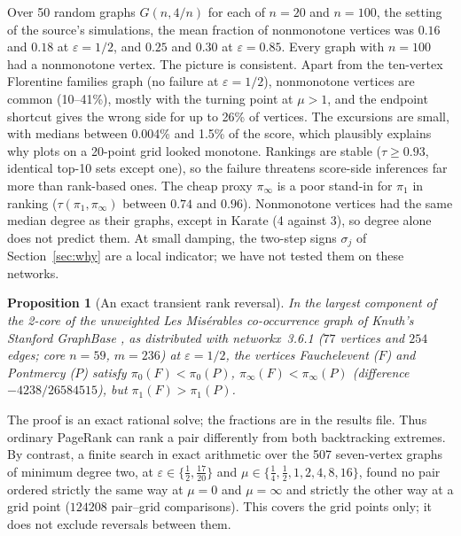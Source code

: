 \documentclass[11pt,a4paper]{article}
\newtheorem{proposition}[theorem]{Proposition}
\theoremstyle{definition}\newtheorem{conjecture}{Conjecture}
\theoremstyle{remark}\newtheorem{remark}[theorem]{Remark}
\newcommand{\eps}{\varepsilon}
\begin{document}
Over 50 random graphs $G(n,4/n)$ for each of $n=20$ and $n=100$, the setting of the source's simulations, the mean fraction of nonmonotone vertices was $0.16$ and $0.18$ at $\eps=1/2$, and $0.25$ and $0.30$ at $\eps=0.85$. Every graph with $n=100$ had a nonmonotone vertex. The picture is consistent. Apart from the ten-vertex Florentine families graph (no failure at $\eps=1/2$), nonmonotone vertices are common (10--41\%), mostly with the turning point at $\mu>1$, and the endpoint shortcut gives the wrong side for up to 26\% of vertices. The excursions are small, with medians between 0.004\% and 1.5\% of the score, which plausibly explains why plots on a 20-point grid looked monotone. Rankings are stable ($\tau\geq0.93$, identical top-10 sets except one), so the failure threatens score-side inferences far more than rank-based ones. The cheap proxy $\pi_\infty$ is a poor stand-in for $\pi_1$ in ranking ($\tau(\pi_1,\pi_\infty)$ between $0.74$ and $0.96$). Nonmonotone vertices had the same median degree as their graphs, except in Karate (4 against 3), so degree alone does not predict them. At small damping, the two-step signs $\sigma_j$ of Section~\ref{sec:why} are a local indicator; we have not tested them on these networks.

\begin{proposition}[An exact transient rank reversal]\label{prop:reversal}
In the largest component of the 2-core of the unweighted Les Mis\'erables co-occurrence graph of Knuth's Stanford GraphBase \cite{knuth}, as distributed with networkx~3.6.1 \cite{networkx} ($77$ vertices and $254$ edges; core $n=59$, $m=236$) at $\eps=1/2$, the vertices Fauchelevent ($F$) and Pontmercy ($P$) satisfy $\pi_0(F)<\pi_0(P)$, $\pi_\infty(F)<\pi_\infty(P)$ (difference $-4238/26584515$), but $\pi_1(F)>\pi_1(P)$.
\end{proposition}
The proof is an exact rational solve; the fractions are in the results file. Thus ordinary PageRank can rank a pair differently from both backtracking extremes. By contrast, a finite search in exact arithmetic over the 507 seven-vertex graphs of minimum degree two, at $\eps\in\{\tfrac12,\tfrac{17}{20}\}$ and $\mu\in\{\tfrac14,\tfrac12,1,2,4,8,16\}$, found no pair ordered strictly the same way at $\mu=0$ and $\mu=\infty$ and strictly the other way at a grid point ($124208$ pair--grid comparisons). This covers the grid points only; it does not exclude reversals between them.
\end{document}
